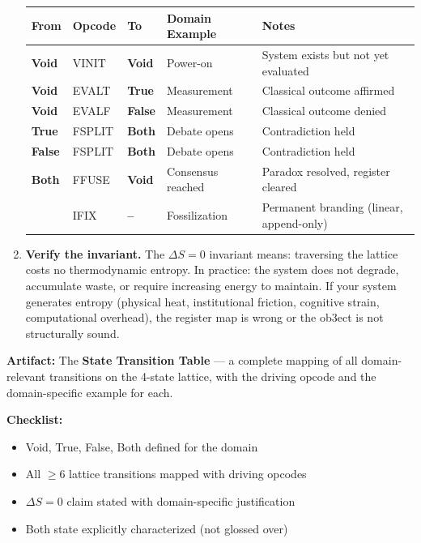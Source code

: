 \documentclass[12pt,a4paper]{article}
\begin{document}
\begin{enumerate}[label=\textbf{3.\arabic*.}, leftmargin=2em]
{\small
\begin{tabularx}{\textwidth}{>{\bfseries}p{2cm} p{2cm} >{\bfseries}p{2cm} p{3cm} X}
\toprule
{\bf From} & {\bf Opcode} & {\bf To} & {\bf Domain Example} & {\bf Notes} \\
\midrule
Void & VINIT & Void & Power-on & System exists but not yet evaluated \\
Void & EVALT & True & Measurement & Classical outcome affirmed \\
Void & EVALF & False & Measurement & Classical outcome denied \\
True & FSPLIT & Both & Debate opens & Contradiction held \\
False & FSPLIT & Both & Debate opens & Contradiction held \\
Both & FFUSE & Void & Consensus reached & Paradox resolved, register cleared \\
& IFIX & -- & Fossilization & Permanent branding (linear, append-only) \\
\bottomrule
\end{tabularx}
}

\item \textbf{Verify the invariant.} The $\Delta S = 0$ invariant means: traversing
    the lattice costs no thermodynamic entropy. In practice: the system does not
    degrade, accumulate waste, or require increasing energy to maintain. If your
    system generates entropy (physical heat, institutional friction, cognitive strain,
    computational overhead), the register map is wrong or the ob3ect is not structurally
    sound.
\end{enumerate}

{\bf Artifact:} The \textbf{State Transition Table} — a complete mapping of all
domain-relevant transitions on the 4-state lattice, with the driving opcode and
the domain-specific example for each.

{\bf Checklist:}
\begin{itemize}
\item[ ] Void, True, False, Both defined for the domain
\item[ ] All $\geq 6$ lattice transitions mapped with driving opcodes
\item[ ] $\Delta S = 0$ claim stated with domain-specific justification
\item[ ] Both state explicitly characterized (not glossed over)
\end{itemize}

\end{document}
